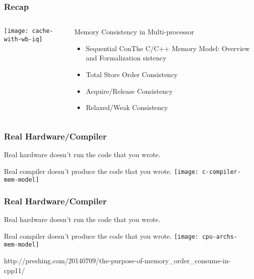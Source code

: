 \begin{frame}[plain]	
    \frametitle{Recap}
    
    
    \begin{columns}
        
        \begin{column}{.4\textwidth}
            \texttt{[image: cache-with-wb-iq]}
        \end{column}
        \begin{column}{.6\textwidth}
			
\Large
 Memory Consistency in Multi-processor
\begin{itemize}
    \item Sequential ConThe C/C++ Memory Model:
    Overview and Formalization
    sistency
    \item  Total Store Order Consistency
    \item Acquire/Release Consistency
    
    \item Relaxed/Weak Consistency
    
    
\end{itemize}
        \end{column}
    \end{columns}
    
\end{frame}


\begin{frame}
  \frametitle{Real Hardware/Compiler}
    Real hardware doesn’t run the code that you wrote.
    
    Real compiler doesn’t produce the code that you wrote.
    \texttt{[image: c-compiler-mem-model]}
\end{frame}


\begin{frame}
    \frametitle{Real Hardware/Compiler}
    Real hardware doesn’t run the code that you wrote.
    
    Real compiler doesn’t produce the code that you wrote.
    \texttt{[image: cpu-archs-mem-model]}
    
        \tiny
    http://preshing.com/20140709/the-purpose-of-memory\_order\_consume-in-cpp11/
    
\end{frame}

